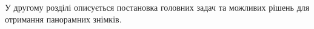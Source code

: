 У другому розділі описується постановка головних 
задач та можливих рішень для отримання панорамних знімків.

